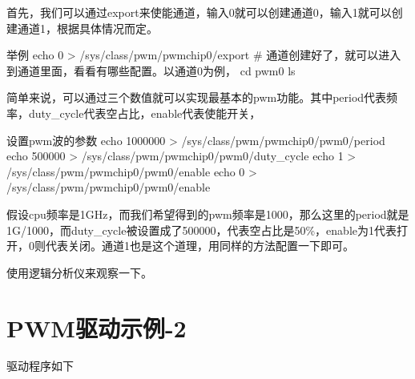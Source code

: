\documentclass[lang=cn,newtx,10pt,scheme=chinese]{elegantbook}
\begin{document}
首先，我们可以通过export来使能通道，输入0就可以创建通道0，输入1就可以创建通道1，根据具体情况而定。

\begin{mycode}{举例}
echo 0 > /sys/class/pwm/pwmchip0/export
# 通道创建好了，就可以进入到通道里面，看看有哪些配置。以通道0为例，
cd pwm0
ls
\end{mycode}

简单来说，可以通过三个数值就可以实现最基本的pwm功能。其中period代表频率，duty\_cycle代表空占比，enable代表使能开关，

\begin{mycode}{设置pwm波的参数}
echo 1000000 > /sys/class/pwm/pwmchip0/pwm0/period
echo 500000 > /sys/class/pwm/pwmchip0/pwm0/duty_cycle
echo 1 > /sys/class/pwm/pwmchip0/pwm0/enable
echo 0 > /sys/class/pwm/pwmchip0/pwm0/enable
\end{mycode}

假设cpu频率是1GHz，而我们希望得到的pwm频率是1000，那么这里的period就是1G/1000，而duty\_cycle被设置成了500000，代表空占比是50\%，enable为1代表打开，0则代表关闭。通道1也是这个道理，用同样的方法配置一下即可。

使用逻辑分析仪来观察一下。

\chapter{PWM驱动示例-2}

驱动程序如下
\end{document}
